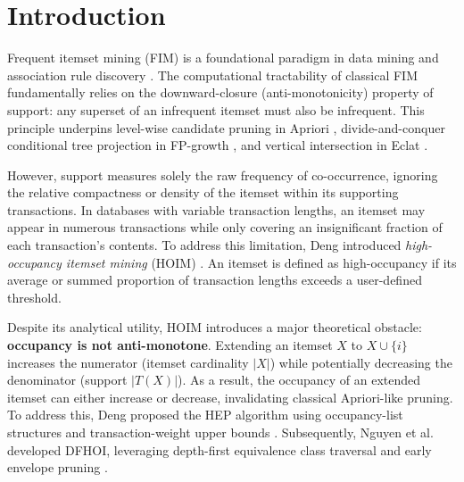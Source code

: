 \documentclass[runningheads,orivec]{llncs}
\newcommand{\HEP}{\textsc{HEP}}
\newcommand{\DFHOI}{\textsc{DFHOI}}
\begin{document}
\section{Introduction}

Frequent itemset mining (FIM) is a foundational paradigm in data mining and association rule discovery \cite{agrawal1993mining,agrawal1994fast}. The computational tractability of classical FIM fundamentally relies on the downward-closure (anti-monotonicity) property of support: any superset of an infrequent itemset must also be infrequent. This principle underpins level-wise candidate pruning in Apriori \cite{agrawal1994fast}, divide-and-conquer conditional tree projection in FP-growth \cite{han2000mining}, and vertical intersection in Eclat \cite{zaki1997new,zaki2000scalable}.

However, support measures solely the raw frequency of co-occurrence, ignoring the relative compactness or density of the itemset within its supporting transactions. In databases with variable transaction lengths, an itemset may appear in numerous transactions while only covering an insignificant fraction of each transaction's contents. To address this limitation, Deng introduced \emph{high-occupancy itemset mining} (HOIM) \cite{deng2020mining}. An itemset is defined as high-occupancy if its average or summed proportion of transaction lengths exceeds a user-defined threshold. 

Despite its analytical utility, HOIM introduces a major theoretical obstacle: \textbf{occupancy is not anti-monotone}. Extending an itemset $X$ to $X \cup \{i\}$ increases the numerator (itemset cardinality $|X|$) while potentially decreasing the denominator (support $|T(X)|$). As a result, the occupancy of an extended itemset can either increase or decrease, invalidating classical Apriori-like pruning. To address this, Deng proposed the \HEP{} algorithm using occupancy-list structures and transaction-weight upper bounds \cite{deng2020mining}. Subsequently, Nguyen et al. developed \DFHOI, leveraging depth-first equivalence class traversal and early envelope pruning \cite{nguyen2023efficient}.
\end{document}
